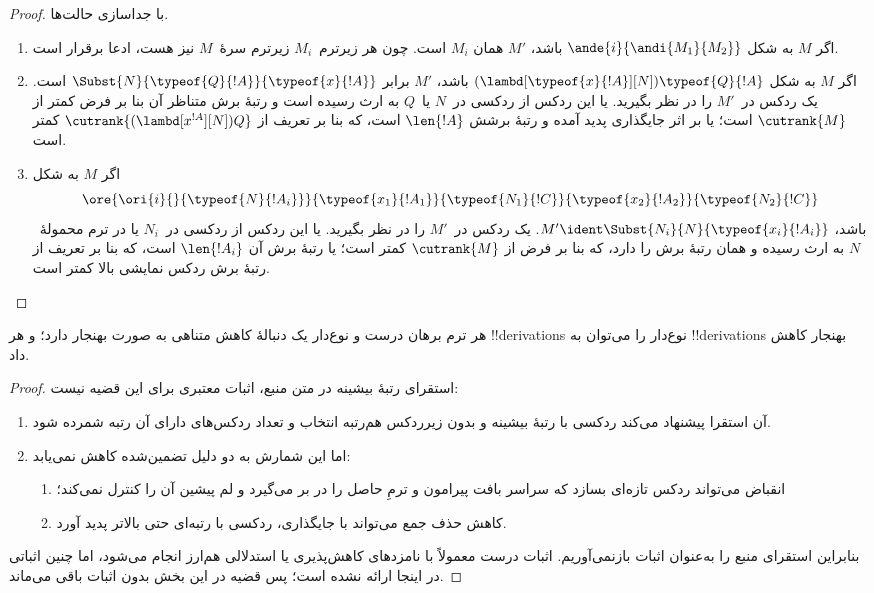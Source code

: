 \documentclass[../../../include/open-logic-section]{subfiles}
\begin{document}
\begin{proof}
  با جداسازی حالت‌ها.
  \begin{enumerate}
  \item اگر $M$ به شکل $\ande{i}{\andi{M_1}{M_2}}$ باشد، $M'$ همان
    $M_i$ است. چون هر زیرترم~$M_i$ زیرترم سرهٔ~$M$ نیز هست، ادعا
    برقرار است.
  \item اگر $M$ به شکل
    $(\lambd[\typeof{x}{!A}][N])\typeof{Q}{!A}$ باشد، $M'$ برابر
    $\Subst{N}{\typeof{Q}{!A}}{\typeof{x}{!A}}$ است. یک ردکس در~$M'$
    را در نظر بگیرید. یا این ردکس از ردکسی در~$N$ یا~$Q$ به ارث رسیده
    است و رتبهٔ برش متناظر آن بنا بر فرض کمتر از $\cutrank{M}$ است؛
    یا بر اثر جایگذاری پدید آمده و رتبهٔ برشش $\len{!A}$ است، که بنا
    بر تعریف از $\cutrank{(\lambd[x^{!A}][N])Q}$ کمتر است.
  \item اگر $M$ به شکل
    \[
    \ore{\ori{i}{}{\typeof{N}{!A_i}}}
        {\typeof{x_1}{!A_1}}{\typeof{N_1}{!C}}
        {\typeof{x_2}{!A_2}}{\typeof{N_2}{!C}}
    \]
    باشد، $M' \ident \Subst{N_i}{N}{\typeof{x_i}{!A_i}}$. یک ردکس
    در~$M'$ را در نظر بگیرید. یا این ردکس از ردکسی در~$N_i$ یا در ترم
    محمولهٔ~$N$ به ارث رسیده و همان رتبهٔ برش را دارد، که بنا بر فرض
    از $\cutrank{M}$ کمتر است؛ یا رتبهٔ برش آن $\len{!A_i}$ است، که
    بنا بر تعریف از رتبهٔ برش ردکس نمایشی بالا کمتر است.
  \end{enumerate}
\end{proof}

\begin{thm}
  هر ترم برهان درست و نوع‌دار یک دنبالهٔ کاهش متناهی به صورت بهنجار
  دارد؛ و هر !!{derivation}s نوع‌دار را می‌توان به !!{derivation}s
  بهنجار کاهش داد.
\end{thm}

\begin{proof}
  استقرای رتبهٔ بیشینه در متن منبع، اثبات معتبری برای این قضیه نیست:
  \begin{enumerate}
  \item آن استقرا پیشنهاد می‌کند ردکسی با رتبهٔ بیشینه و بدون زیرردکس
    هم‌رتبه انتخاب و تعداد ردکس‌های دارای آن رتبه شمرده شود.
  \item اما این شمارش به دو دلیل تضمین‌شده کاهش نمی‌یابد:
    \begin{enumerate}
    \item انقباض می‌تواند ردکس تازه‌ای بسازد که سراسر بافت پیرامون و
      ترمِ حاصل را در بر می‌گیرد و لم پیشین آن را کنترل نمی‌کند؛
    \item کاهش حذف جمع می‌تواند با جایگذاری، ردکسی با رتبه‌ای حتی
      بالاتر پدید آورد.
    \end{enumerate}
  \end{enumerate}
  بنابراین استقرای منبع را به‌عنوان اثبات بازنمی‌آوریم. اثبات درست
  معمولاً با نامزدهای کاهش‌پذیری یا استدلالی هم‌ارز انجام می‌شود، اما
  چنین اثباتی در اینجا ارائه نشده است؛ پس قضیه در این بخش بدون اثبات
  باقی می‌ماند.
\end{proof}
\end{document}
